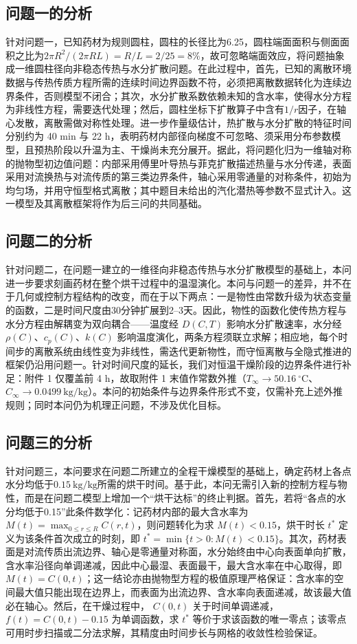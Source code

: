 \documentclass[12pt,a4paper]{article}
\begin{document}
\subsection{问题一的分析}
针对问题一，已知药材为规则圆柱，圆柱的长径比为6.25，圆柱端面面积与侧面面积之比为$2\pi R^2/(2\pi RL)=R/L=2/25=8\%$，故可忽略端面效应，将问题抽象成一维圆柱径向非稳态传热与水分扩散问题。在此过程中，首先，已知的离散环境数据与传热传质方程所需的连续时间边界函数不符，必须把离散数据转化为连续边界条件，否则模型不闭合；其次，水分扩散系数依赖未知的含水率，使得水分方程为非线性方程，需要迭代处理；然后，圆柱坐标下扩散算子中含有$1/r$因子，在轴心发散，离散需做对称性处理。进一步作量级估计，热扩散与水分扩散的特征时间分别约为 40 min 与 22 h，表明药材内部径向梯度不可忽略、须采用分布参数模型，且预热阶段以升温为主、干燥尚未充分展开。据此，将问题化归为一维轴对称的抛物型初边值问题：内部采用傅里叶导热与菲克扩散描述热量与水分传递，表面采用对流换热与对流传质的第三类边界条件，轴心采用零通量的对称条件，初始为均匀场，并用守恒型格式离散；其中题目未给出的汽化潜热等参数不显式计入。这一模型及其离散框架将作为后三问的共同基础。

\subsection{问题二的分析}
针对问题二，在问题一建立的一维径向非稳态传热与水分扩散模型的基础上，本问进一步要求刻画药材在整个烘干过程中的温湿演化。本问与问题一的差异，并不在于几何或控制方程结构的改变，而在于以下两点：一是物性由常数升级为状态变量的函数，二是时间尺度由30分钟扩展到2--3天。因此，物性的函数化使传热方程与水分方程由解耦变为双向耦合——温度经 $D(C,T)$ 影响水分扩散速率，水分经 $\rho(C)$、$c_p(C)$、$k(C)$ 影响温度演化，两条方程须联立求解；相应地，每个时间步的离散系统由线性变为非线性，需迭代更新物性，而守恒离散与全隐式推进的框架仍沿用问题一。针对时间尺度的延长，我们对恒温干燥阶段的边界条件进行补足：附件 1 仅覆盖前 4 h，故取附件 1 末值作常数外推（$T_\infty\rightarrow50.16\ ^\circ\text{C}$、$C_\infty\rightarrow0.0499\ \text{kg/kg}$）。本问的初始条件与边界条件形式不变，仅需补充上述外推规则；同时本问仍为机理正问题，不涉及优化目标。

\subsection{问题三的分析}
针对问题三，本问要求在问题二所建立的全程干燥模型的基础上，确定药材上各点水分均低于$0.15\ \text{kg/kg}$所需的烘干时间。基于此，本问无需引入新的控制方程与物性，而是在问题二模型上增加一个“烘干达标”的终止判据。首先，若将“各点的水分均低于0.15”此条件数学化：记药材内部的最大含水率为 $M(t)=\max_{0\leq r\leq R} C(r,t)$，则问题转化为求 $M(t)<0.15$，烘干时长 $t^*$ 定义为该条件首次成立的时刻，即 $t^*=\min\{t>0: M(t)<0.15\}$。其次，药材表面是对流传质出流边界、轴心是零通量对称面，水分始终由中心向表面单向扩散，含水率沿径向单调递减，因此中心最湿、表面最干，最大含水率在中心取得，即 $M(t)=C(0,t)$；这一结论亦由抛物型方程的极值原理严格保证：含水率的空间最大值只能出现在边界上，而表面为出流边界、含水率向表面递减，故该最大值必在轴心。然后，在干燥过程中， $C(0,t)$ 关于时间单调递减，$f(t)=C(0,t)-0.15$ 为单调函数，求 $t^*$ 等价于求该函数的唯一零点；该零点可用时步扫描或二分法求解，其精度由时间步长与网格的收敛性检验保证。
\end{document}
